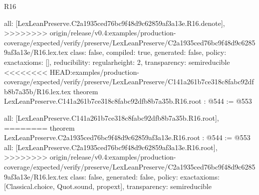 \begin{lexlean}{R16}
\begin{coremodule}
{{{{{  all: [LexLeanPreserve.C2a1935ced76bc9f48d9c62859af3a13e.R16.denote],
>>>>>>>> origin/release/v0.4:examples/production-coverage/expected/verify/preserve/LexLeanPreserve/C2a1935ced76bc9f48d9c62859af3a13e/R16.lex.tex
  class: false,
  compiled: true,
  generated: false,
  policy: exact{axioms: []},
  reducibility: regular{height: 2},
  transparency: semireducible
}
<<<<<<<< HEAD:examples/production-coverage/expected/verify/preserve/LexLeanPreserve/C141a261b7ce318c8fabc92dfb8b7a35b/R16.lex.tex
theorem LexLeanPreserve.C141a261b7ce318c8fabc92dfb8b7a35b.R16.root : @544 := @553 {
  all: [LexLeanPreserve.C141a261b7ce318c8fabc92dfb8b7a35b.R16.root],
========
theorem LexLeanPreserve.C2a1935ced76bc9f48d9c62859af3a13e.R16.root : @544 := @553 {
  all: [LexLeanPreserve.C2a1935ced76bc9f48d9c62859af3a13e.R16.root],
>>>>>>>> origin/release/v0.4:examples/production-coverage/expected/verify/preserve/LexLeanPreserve/C2a1935ced76bc9f48d9c62859af3a13e/R16.lex.tex
  class: false,
  generated: false,
  policy: exact{axioms: [Classical.choice, Quot.sound, propext]},
  transparency: semireducible
}

}}}}}
\end{coremodule}
\end{lexlean}
